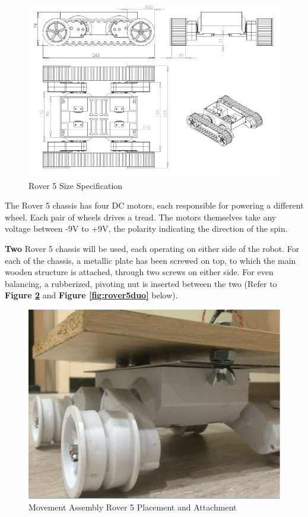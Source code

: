 \documentclass[12p,a4paper]{report}
\begin{document}
\begin{figure}[H]
\begin{center}
\includegraphics[scale=0.95]{rover5}
\caption{Rover 5 Size Specification \cite{rover5}}
\label{fig:rover5}
\end{center}
\end{figure}

The Rover 5 chassis has four DC motors, each responsible for powering a different wheel. Each pair of wheels drives a tread. The motors themselves take any voltage between -9V to +9V, the polarity indicating the direction of the spin. 


\textbf{Two} Rover 5 chassis will be used, each operating on either side of the robot. For each of the chassis, a metallic plate has been screwed on top, to which the main wooden structure is attached, through two screws on either side. For even balancing, a rubberized, pivoting nut is inserted between the two (Refer to \textbf{Figure \ref{fig:rover5robot}} and \textbf{Figure \ref{fig:rover5duo}} below).


\begin{figure}[H]
\begin{center}
\includegraphics[scale=0.40]{rover5robot_low}
\caption{Movement Assembly Rover 5 Placement and Attachment}
\label{fig:rover5robot}
\end{center}
\end{figure}
\end{document}
